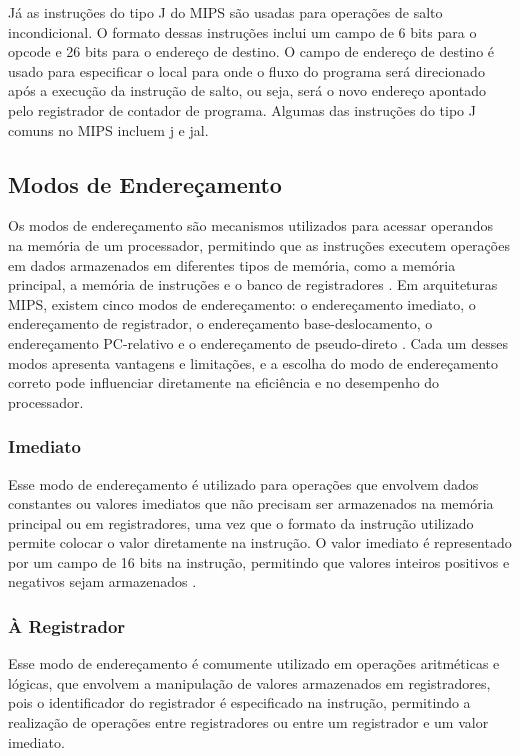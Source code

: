 \documentclass[
	12pt,				%
	openright,			%
	a4paper,			%
	english,			%
	french,				%
	spanish,			%
	brazil,				%
	]{abntex2}
\begin{document}
Já as instruções do tipo J do MIPS são usadas para operações de salto incondicional. O formato dessas instruções inclui um campo de 6 bits para o opcode e 26 bits para o endereço de destino. O campo de endereço de destino é usado para especificar o local para onde o fluxo do programa será direcionado após a execução da instrução de salto, ou seja, será o novo endereço apontado pelo registrador de contador de programa. Algumas das instruções do tipo J comuns no MIPS incluem j e jal.

\subsection{Modos de Endereçamento}
Os modos de endereçamento são mecanismos utilizados para acessar operandos na memória de um processador, permitindo que as instruções executem operações em dados armazenados em diferentes tipos de memória, como a memória principal, a memória de instruções e o banco de registradores \cite{patterson2007}. Em arquiteturas MIPS, existem cinco modos de endereçamento: o endereçamento imediato, o endereçamento de registrador, o endereçamento base-deslocamento, o endereçamento PC-relativo e o endereçamento de pseudo-direto \cite{patterson2006}. Cada um desses modos apresenta vantagens e limitações, e a escolha do modo de endereçamento correto pode influenciar diretamente na eficiência e no desempenho do processador.

\subsubsection{Imediato}
Esse modo de endereçamento é utilizado para operações que envolvem dados constantes ou valores imediatos que não precisam ser armazenados na memória principal ou em registradores, uma vez que o formato da instrução utilizado permite colocar o valor diretamente na instrução. O valor imediato é representado por um campo de 16 bits na instrução, permitindo que valores inteiros positivos e negativos sejam armazenados \cite{patterson2007}. 

\subsubsection{À Registrador}
Esse modo de endereçamento é comumente utilizado em operações aritméticas e lógicas, que envolvem a manipulação de valores armazenados em registradores, pois o identificador do registrador é especificado na instrução, permitindo a realização de operações entre registradores ou entre um registrador e um valor imediato.
\end{document}
